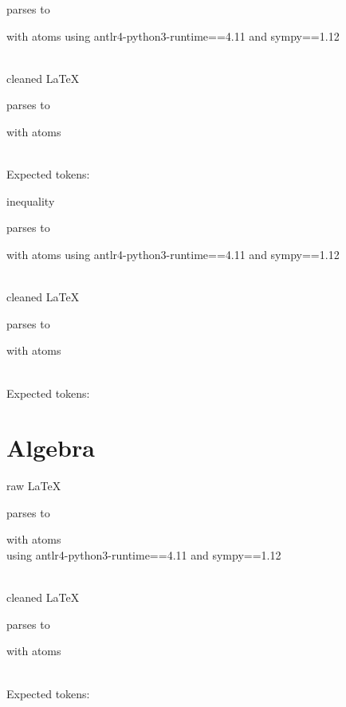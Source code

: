 \documentclass{article}
\begin{document}

parses to

with atoms
using antlr4-python3-runtime==4.11 and sympy==1.12

\ \\
cleaned \LaTeX

parses to

with atoms


\ \\
Expected tokens:



\hrulefill

inequality

parses to

with atoms
using antlr4-python3-runtime==4.11 and sympy==1.12

\ \\
cleaned \LaTeX

parses to

with atoms


\ \\
Expected tokens:


\hrulefill

\section{Algebra}

\hrulefill

raw \LaTeX

parses to 

with atoms 
\\
using antlr4-python3-runtime==4.11 and sympy==1.12

\ \\
cleaned \LaTeX

parses to 

with atoms 


\ \\
Expected tokens: 

\end{document}
